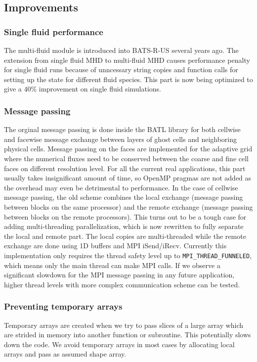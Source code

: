 \documentclass[fleqn,11pt]{SelfArx} %
\begin{document}
\subsection{Improvements}

\subsubsection{Single fluid performance}
The multi-fluid module is introduced into BATS-R-US several years ago. The extension from single fluid MHD to multi-fluid MHD causes performance penalty for single fluid runs because of unncessary string copies and function calls for setting up the state for different fluid species. This part is now being optimized to give a $40\%$ improvement on single fluid simulations.

\subsubsection{Message passing}
The orginal message passing is done inside the BATL library for both cellwise and facewise message exchange between layers of ghost cells and neighboring physical cells. Message passing on the faces are implemented for the adaptive grid where the numerical fluxes need to be conserved between the coarse and fine cell faces on different resolution level. For all the current real applications, this part usually takes insignificant amount of time, so OpenMP pragmas are not added as the overhead may even be detrimental to performance. In the case of cellwise message passing, the old scheme combines the local exchange (message passing between blocks on the same processor) and the remote exchange (message passing between blocks on the remote processors). This turns out to be a tough case for adding multi-threading parallelization, which is now rewritten to fully separate the local and remote part. The local copies are multi-threaded while the remote exchange are done using 1D buffers and MPI iSend/iRecv. Currently this implementation only requires the thread safety level up to \verb|MPI_THREAD_FUNNELED|, which means only the main thread can make MPI calls. If we observe a significant slowdown for the MPI message passing in any future application, higher thread levels with more complex communication scheme can be tested.


\subsubsection{Preventing temporary arrays}
Temporary arrays are created when we try to pass slices of a large array which are strided in memory into another function or subroutine. This potentially slows down the code. We avoid temporary arrays in most cases by allocating local arrays and pass as assumed shape array.
\end{document}
